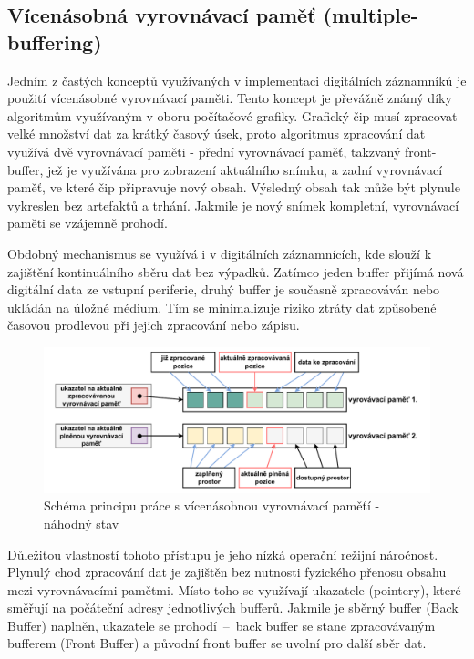 \subsection{Vícenásobná vyrovnávací paměť (multiple-buffering)}
Jedním z častých konceptů využívaných v implementaci digitálních záznamníků je použití vícenásobné vyrovnávací paměti. Tento koncept je převážně známý díky algoritmům využívaným v oboru počítačové grafiky. Grafický čip musí zpracovat velké množství dat za krátký časový úsek, proto algoritmus zpracování dat využívá dvě vyrovnávací paměti - přední vyrovnávací paměť, takzvaný front-buffer, jež je využívána pro zobrazení aktuálního snímku, a zadní vyrovnávací paměť, ve které čip připravuje nový obsah. Výsledný obsah tak může být plynule vykreslen bez artefaktů a trhání. Jakmile je nový snímek kompletní, vyrovnávací paměti se vzájemně prohodí. \cite{double_buffering_model}

Obdobný mechanismus se využívá i v digitálních záznamnících, kde slouží k zajištění kontinuálního sběru dat bez výpadků. Zatímco jeden buffer přijímá nová digitální data ze vstupní periferie, druhý buffer je současně zpracováván nebo ukládán na úložné médium. Tím se minimalizuje riziko ztráty dat způsobené časovou prodlevou při jejich zpracování nebo zápisu.

\begin{figure}[h]
    \centering
    \includegraphics[width=1.00\textwidth]{obrazky-figures/multiple_buffering-1.pdf}
    
    \caption{Schéma principu práce s vícenásobnou vyrovnávací paměťí - náhodný stav}
    \label{fig:multiple-buffering-1}
\end{figure}

Důležitou vlastností tohoto přístupu je jeho nízká operační režijní náročnost. Plynulý chod zpracování dat je zajištěn bez nutnosti fyzického přenosu obsahu mezi vyrovnávacími pamětmi. Místo toho se využívají ukazatele (pointery), které směřují na počáteční adresy jednotlivých bufferů. Jakmile je sběrný buffer (Back Buffer) naplněn, ukazatele se prohodí~–~back buffer se stane zpracovávaným bufferem (Front Buffer) a původní front buffer se uvolní pro další sběr dat.

